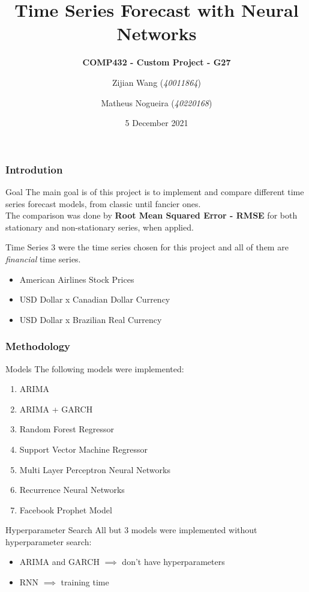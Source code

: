\documentclass{beamer}
\title{Time Series Forecast with Neural Networks}
\subtitle{\textbf{COMP432 - Custom Project - G27}}
\author{Zijian Wang (\textit{40011864}) \and Matheus Nogueira (\textit{40220168})}
\date{5 December 2021}
\institute{\textbf{Concordia University}}
\begin{document}
	
	\frame{\titlepage}
		
	\begin{frame}
		\frametitle{Introdution}
		\begin{block}{Goal}
			The main goal is of this project is to implement and compare different time series forecast models, from classic until fancier ones.\\
			
			The comparison was done by \textbf{Root Mean Squared Error - RMSE} for both stationary and non-stationary series, when applied.
		\end{block}\pause
		\begin{block}{Time Series}
			3 were the time series chosen for this project and all of them are \textit{financial} time series.\pause
			\begin{itemize}
				\item American Airlines Stock Prices
				\item USD Dollar x Canadian Dollar Currency
				\item USD Dollar x Brazilian Real Currency
			\end{itemize}
		\end{block}
	\end{frame}
		
	\begin{frame}
		\frametitle{Methodology}
		\begin{block}{Models}
			The following models were implemented:\pause
			\begin{enumerate}
				\item ARIMA
				\item ARIMA + GARCH
				\item Random Forest Regressor
				\item Support Vector Machine Regressor
				\item Multi Layer Perceptron Neural Networks
				\item Recurrence Neural Networks
				\item Facebook Prophet Model
			\end{enumerate}
		\end{block}\pause
		\begin{block}{Hyperparameter Search}
			All but 3 models were implemented without hyperparameter search:\pause
			\begin{itemize}
				\item ARIMA and GARCH $\implies$ don't have hyperparameters
				\item RNN $\implies$ training time
			\end{itemize}
		\end{block}
	\end{frame}
	
\end{document}

